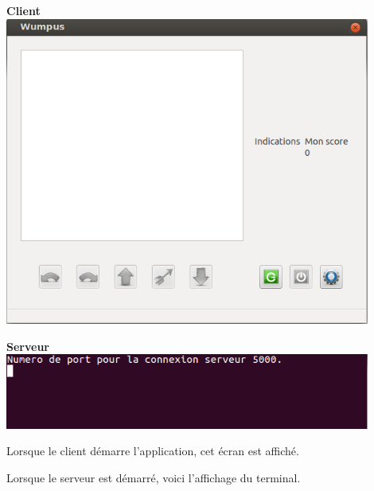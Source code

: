 \documentclass[a4paper,10pt]{article}
\begin{document}
		\begin{minipage}[t]{0.46\textwidth}
				\begin{center}
					\textbf{Client}\\
					\vspace{2pt}
				 \includegraphics[width=0.9\textwidth]{JeuxDEssais/Wumpus1.png}
				\end{center}
		\end{minipage}
		\hfill
		\begin{minipage}[t]{0.46\textwidth}
				\begin{center}
					\textbf{Serveur}\\
					\vspace{70pt}
					\includegraphics[width=0.9\textwidth]{JeuxDEssais/Serveur1.png}
				\end{center}
		\end{minipage}
		
		\begin{minipage}[t]{0.46\textwidth}
			\vspace{2pt}
			Lorsque le client démarre l'application, cet écran est affiché.
		\end{minipage}
		\hfill
		\begin{minipage}[t]{0.46\textwidth}
			\vspace{2pt}
			Lorsque le serveur est démarré, voici l'affichage du terminal.
		\end{minipage}\\
\end{document}
